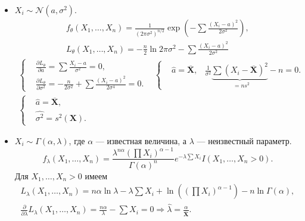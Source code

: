 \begin{example}
\begin{itemize}
        \item $X_i \sim \mathcal{N}(a, \sigma^2)$. \begin{gather*}
        f_{\theta}(X_1,\ldots, X_n) = \frac{1}{(2\pi\sigma^2)^{n/2}}\exp\left(-\sum{\frac{(X_i-a)^2}{2\sigma^2}}\right),\\
        L_{\theta}(X_1, \ldots, X_n) = -\frac{n}{2}\ln{2\pi\sigma^2} - \sum{\frac{(X_i-a)^2}{2\sigma^2}}
        \end{gather*}
        \begin{gather*}
        \left\{
        \begin{aligned}
        &\frac{\partial L_{\theta}}{\partial a} = \sum{\frac{X_i-a}{\sigma^2}} = 0,\\
        &\frac{\partial L_{\theta}}{\partial \sigma^2} = - \frac{n}{2\sigma^2} + \sum{\frac{(X_i-a)^2}{2\sigma^4}} = 0.
        \end{aligned}\right.\;\;\;
        \left\{
        \begin{aligned}
        &\widehat{a} = \overline{\mathbf X},
        &\frac{1}{\sigma^2}{\underbrace{\sum (X_i - \overline{\mathbf X})^2}_{\phantom{0}=ns^2}} - n = 0.
        \end{aligned}\right.\\
        \left\{
        \begin{aligned}
        &\widehat{a} = \overline{\mathbf X},\\
        &\widehat{\sigma^2} = s^2(\mathbf X).
        \end{aligned}\right.
    \end{gather*}

        \item $X_i \sim \Gamma(\alpha, \lambda)$, где $\alpha$ --- известная величина, а $\lambda$ --- неизвестный параметр.
        \[
    f_{\lambda}(X_1,\ldots, X_n) = \frac{\lambda^{n\alpha} \left(\prod X_i\right)^{\alpha-1}}{\Gamma(\alpha)^n}e^{-\lambda\sum X_i}I(X_1,\ldots,X_n>0).
    \]
    Для $X_1,\ldots,X_n>0$ имеем
    \begin{gather*}
        L_{\lambda}(X_1,\ldots, X_n) = n\alpha\ln{\lambda} - \lambda \sum X_i + \ln{\left(\left(\prod X_i\right)^{\alpha-1}\right)} - n\ln{\Gamma(\alpha)},\\
        \frac{\partial}{\partial \lambda} L_{\lambda}(X_1,\ldots, X_n) = \frac{n\alpha}{\lambda} - \sum X_i = 0 \Longrightarrow \widehat{\lambda} = \frac{\alpha}{\overline{\mathbf X}}.
    \end{gather*}


\end{itemize}
\end{example}
